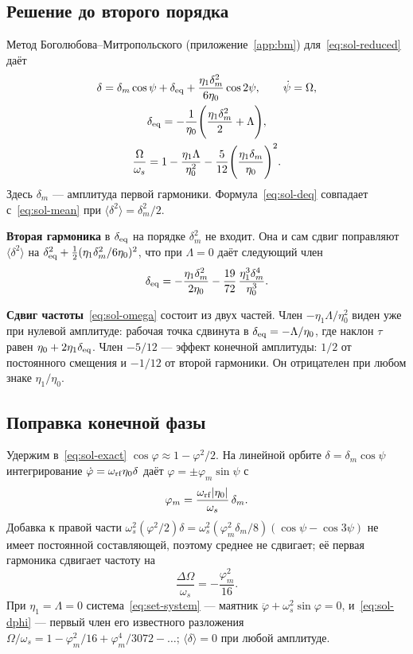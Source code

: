 \subsection{Решение до второго порядка}

Метод Боголюбова--Митропольского (приложение~\ref{app:bm}) для~\eqref{eq:sol-reduced} даёт
\begin{gather}
\label{eq:sol-delta}
\delta=\delta_m\cos\psi+\delta_{\mathrm{eq}}+\frac{\eta_1\delta_m^2}{6\eta_0}\cos 2\psi,
\qquad
\dot\psi=\Omega,
\\
\label{eq:sol-deq}
\delta_{\mathrm{eq}}=-\frac{1}{\eta_0}\Biggl(\frac{\eta_1\delta_m^2}{2}+\Lambda\Biggr),
\\
\label{eq:sol-omega}
\frac{\Omega}{\omega_s}=1-\frac{\eta_1\Lambda}{\eta_0^2}-\frac{5}{12}\Biggl(\frac{\eta_1\delta_m}{\eta_0}\Biggr)^2.
\end{gather}
Здесь $\delta_m$ --- амплитуда первой гармоники. Формула~\eqref{eq:sol-deq} совпадает с~\eqref{eq:sol-mean} при $\langle\delta^2\rangle=\delta_m^2/2$.

\textbf{Вторая гармоника} в $\delta_{\mathrm{eq}}$ на порядке $\delta_m^2$ не входит. Она и сам сдвиг поправляют $\langle\delta^2\rangle$ на $\delta_{\mathrm{eq}}^2+\tfrac12(\eta_1\delta_m^2/6\eta_0)^2$, что при $\Lambda=0$ даёт следующий член
\begin{equation}
\label{eq:sol-a4}
\delta_{\mathrm{eq}}=-\frac{\eta_1\delta_m^2}{2\eta_0}-\frac{19}{72}\,\frac{\eta_1^3\delta_m^4}{\eta_0^3}.
\end{equation}

\textbf{Сдвиг частоты}~\eqref{eq:sol-omega} состоит из двух частей. Член $-\eta_1\Lambda/\eta_0^2$ виден уже при нулевой амплитуде: рабочая точка сдвинута в $\delta_{\mathrm{eq}}=-\Lambda/\eta_0$, где наклон $\tau$ равен $\eta_0+2\eta_1\delta_{\mathrm{eq}}$. Член $-5/12$ --- эффект конечной амплитуды: $1/2$ от постоянного смещения и $-1/12$ от второй гармоники. Он отрицателен при любом знаке $\eta_1/\eta_0$.

\subsection{Поправка конечной фазы}

Удержим в~\eqref{eq:sol-exact} $\cos\varphi\approx 1-\varphi^2/2$. На линейной орбите $\delta=\delta_m\cos\psi$ интегрирование $\dot\varphi=\omega_{\mathrm{rf}}\eta_0\delta$ даёт $\varphi=\pm\varphi_m\sin\psi$ с
\begin{equation}
\label{eq:sol-phim}
\varphi_m=\frac{\omega_{\mathrm{rf}}|\eta_0|}{\omega_s}\,\delta_m .
\end{equation}
Добавка к правой части $\omega_s^2(\varphi^2/2)\delta=\omega_s^2(\varphi_m^2\delta_m/8)(\cos\psi-\cos 3\psi)$ не имеет постоянной составляющей, поэтому среднее не сдвигает; её первая гармоника сдвигает частоту на
\begin{equation}
\label{eq:sol-dphi}
\frac{\Delta\Omega}{\omega_s}=-\frac{\varphi_m^2}{16}.
\end{equation}
При $\eta_1=\Lambda=0$ система~\eqref{eq:set-system} --- маятник $\ddot\varphi+\omega_s^2\sin\varphi=0$, и~\eqref{eq:sol-dphi} --- первый член его известного разложения $\Omega/\omega_s=1-\varphi_m^2/16+\varphi_m^4/3072-\dots$; $\langle\delta\rangle=0$ при любой амплитуде.

